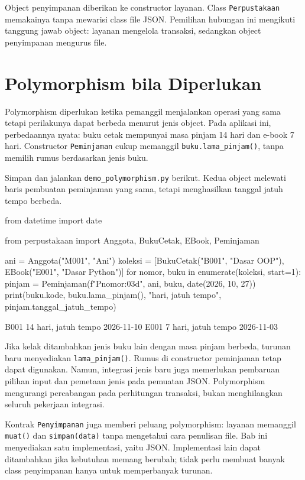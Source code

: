 Object penyimpanan diberikan ke constructor layanan. Class \texttt{Perpustakaan} memakainya tanpa mewarisi class file JSON. Pemilihan hubungan ini mengikuti tanggung jawab object: layanan mengelola transaksi, sedangkan object penyimpanan mengurus file.

\section{Polymorphism bila Diperlukan}

Polymorphism diperlukan ketika pemanggil menjalankan operasi yang sama tetapi perilakunya dapat berbeda menurut jenis object. Pada aplikasi ini, perbedaannya nyata: buku cetak mempunyai masa pinjam 14 hari dan e-book 7 hari. Constructor \texttt{Peminjaman} cukup memanggil \texttt{buku.lama\_pinjam()}, tanpa memilih rumus berdasarkan jenis buku.

Simpan dan jalankan \texttt{demo\_polymorphism.py} berikut. Kedua object melewati baris pembuatan peminjaman yang sama, tetapi menghasilkan tanggal jatuh tempo berbeda.

\begin{kode}
from datetime import date

from perpustakaan import Anggota, BukuCetak, EBook, Peminjaman


ani = Anggota("M001", "Ani")
koleksi = [BukuCetak("B001", "Dasar OOP"), EBook("E001", "Dasar Python")]
for nomor, buku in enumerate(koleksi, start=1):
    pinjam = Peminjaman(f"P{nomor:03d}", ani, buku, date(2026, 10, 27))
    print(buku.kode, buku.lama_pinjam(), "hari, jatuh tempo",
          pinjam.tanggal_jatuh_tempo)
\end{kode}

\begin{keluaran}
B001 14 hari, jatuh tempo 2026-11-10
E001 7 hari, jatuh tempo 2026-11-03
\end{keluaran}

Jika kelak ditambahkan jenis buku lain dengan masa pinjam berbeda, turunan baru menyediakan \texttt{lama\_pinjam()}. Rumus di constructor peminjaman tetap dapat digunakan. Namun, integrasi jenis baru juga memerlukan pembaruan pilihan input dan pemetaan jenis pada pemuatan JSON. Polymorphism mengurangi percabangan pada perhitungan transaksi, bukan menghilangkan seluruh pekerjaan integrasi.

Kontrak \texttt{Penyimpanan} juga memberi peluang polymorphism: layanan memanggil \texttt{muat()} dan \texttt{simpan(data)} tanpa mengetahui cara penulisan file. Bab ini menyediakan satu implementasi, yaitu JSON. Implementasi lain dapat ditambahkan jika kebutuhan memang berubah; tidak perlu membuat banyak class penyimpanan hanya untuk memperbanyak turunan.

